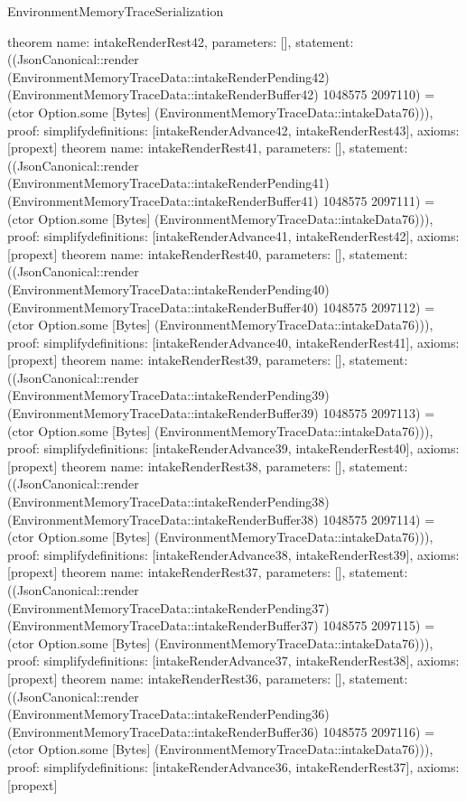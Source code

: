 \begin{lexlean}{EnvironmentMemoryTraceSerialization}
\begin{semanticmodule}
{}
theorem{
 name: intakeRenderRest42, parameters: [],
 statement: ((JsonCanonical::render (EnvironmentMemoryTraceData::intakeRenderPending42) (EnvironmentMemoryTraceData::intakeRenderBuffer42) 1048575 2097110) = (ctor Option.some [Bytes] (EnvironmentMemoryTraceData::intakeData76))), proof: simplify{definitions: [intakeRenderAdvance42, intakeRenderRest43]}, axioms: [propext]
}
theorem{
 name: intakeRenderRest41, parameters: [],
 statement: ((JsonCanonical::render (EnvironmentMemoryTraceData::intakeRenderPending41) (EnvironmentMemoryTraceData::intakeRenderBuffer41) 1048575 2097111) = (ctor Option.some [Bytes] (EnvironmentMemoryTraceData::intakeData76))), proof: simplify{definitions: [intakeRenderAdvance41, intakeRenderRest42]}, axioms: [propext]
}
theorem{
 name: intakeRenderRest40, parameters: [],
 statement: ((JsonCanonical::render (EnvironmentMemoryTraceData::intakeRenderPending40) (EnvironmentMemoryTraceData::intakeRenderBuffer40) 1048575 2097112) = (ctor Option.some [Bytes] (EnvironmentMemoryTraceData::intakeData76))), proof: simplify{definitions: [intakeRenderAdvance40, intakeRenderRest41]}, axioms: [propext]
}
theorem{
 name: intakeRenderRest39, parameters: [],
 statement: ((JsonCanonical::render (EnvironmentMemoryTraceData::intakeRenderPending39) (EnvironmentMemoryTraceData::intakeRenderBuffer39) 1048575 2097113) = (ctor Option.some [Bytes] (EnvironmentMemoryTraceData::intakeData76))), proof: simplify{definitions: [intakeRenderAdvance39, intakeRenderRest40]}, axioms: [propext]
}
theorem{
 name: intakeRenderRest38, parameters: [],
 statement: ((JsonCanonical::render (EnvironmentMemoryTraceData::intakeRenderPending38) (EnvironmentMemoryTraceData::intakeRenderBuffer38) 1048575 2097114) = (ctor Option.some [Bytes] (EnvironmentMemoryTraceData::intakeData76))), proof: simplify{definitions: [intakeRenderAdvance38, intakeRenderRest39]}, axioms: [propext]
}
theorem{
 name: intakeRenderRest37, parameters: [],
 statement: ((JsonCanonical::render (EnvironmentMemoryTraceData::intakeRenderPending37) (EnvironmentMemoryTraceData::intakeRenderBuffer37) 1048575 2097115) = (ctor Option.some [Bytes] (EnvironmentMemoryTraceData::intakeData76))), proof: simplify{definitions: [intakeRenderAdvance37, intakeRenderRest38]}, axioms: [propext]
}
theorem{
 name: intakeRenderRest36, parameters: [],
 statement: ((JsonCanonical::render (EnvironmentMemoryTraceData::intakeRenderPending36) (EnvironmentMemoryTraceData::intakeRenderBuffer36) 1048575 2097116) = (ctor Option.some [Bytes] (EnvironmentMemoryTraceData::intakeData76))), proof: simplify{definitions: [intakeRenderAdvance36, intakeRenderRest37]}, axioms: [propext]
}
\end{semanticmodule}
\end{lexlean}
